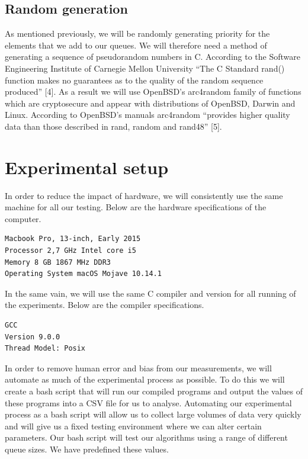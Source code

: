 \documentclass[12pt]{article}
\begin{document}
\subsection{Random generation}

As mentioned previously, we will be randomly generating priority for the elements that we add to our queues. We will therefore need a method of generating a sequence of pseudorandom numbers in C. According to the Software Engineering Institute of Carnegie Mellon University “The C Standard rand() function makes no guarantees as to the quality of the random sequence produced” [4]. As a result we will use OpenBSD’s arc4random family of functions which are cryptosecure and appear with distributions of OpenBSD, Darwin and Linux. According to OpenBSD’s manuals arc4random “provides higher quality data than those described in rand, random and rand48” [5]. 

\section{Experimental setup}

In order to reduce the impact of hardware, we will consistently use the same machine for all our testing. Below are the hardware specifications of the computer.

\begin{verbatim}
Macbook Pro, 13-inch, Early 2015
Processor 2,7 GHz Intel core i5
Memory 8 GB 1867 MHz DDR3
Operating System macOS Mojave 10.14.1
\end{verbatim}

In the same vain, we will use the same C compiler and version for all running of the experiments. Below are the compiler specifications.

\begin{verbatim}
GCC
Version 9.0.0
Thread Model: Posix
\end{verbatim}

In order to remove human error and bias from our measurements, we will automate as much of the experimental process as possible. To do this we will create a bash script that will run our compiled programs and output the values of  these programs into a CSV file for us to analyse. Automating our experimental process as a bash script will allow us to collect large volumes of data very quickly and will give us a fixed testing environment where we can alter certain parameters. Our bash script will test our algorithms using a range of different queue sizes. We have predefined these values.
\end{document}
